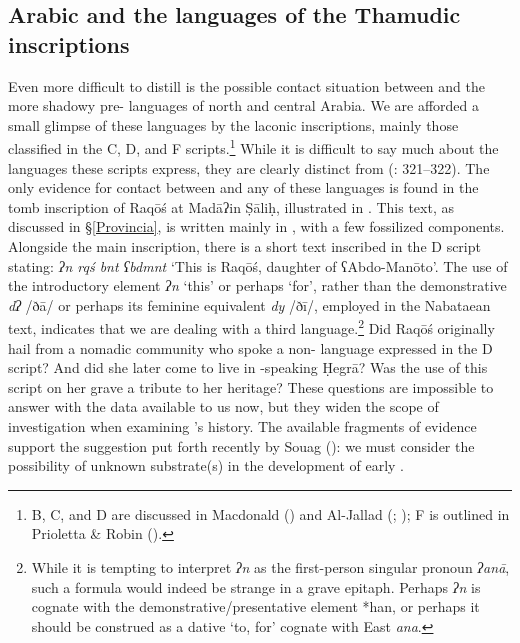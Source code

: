 \documentclass[output=paper]{langsci/langscibook}
\begin{document}
\subsection{Arabic and the languages of the Thamudic inscriptions}
Even more difficult to distill is the possible contact situation between  and the more shadowy pre-  languages of north and central Arabia. We are afforded a small glimpse of these languages by the laconic  inscriptions, mainly those classified in the C, D, and F scripts.\footnote{ B, C, and D are discussed in Macdonald (\citeyear{Macdonald2000}) and Al-Jallad (\citeyear{Al-Jallad2017early}; \citeyear{Al-Jallad2018ANA});  F is outlined in Prioletta \& Robin (\citeyear{PriolettaRobin2018}).}  While it is difficult to say much about the languages these scripts express, they are clearly distinct from  (\citealt{Al-Jallad2017early}: 321--322). The only evidence for contact between  and any of these languages is found in the tomb inscription of Raqōś at Madāʔin Ṣāliḥ, illustrated in . This text, as discussed in §\ref{Provincia}, is written mainly in , with a few fossilized  components. Alongside the main inscription, there is a short text inscribed in the  D script stating: \textit{ʔn rqś bnt ʕbdmnt} ‘This is Raqōś, daughter of ʕAbdo-Manōto’. The use of the introductory element \textit{ʔn} `this' or perhaps `for', rather than the  demonstrative \textit{dʔ} /ðā/ or perhaps its feminine equivalent \textit{dy} /ðī/, employed in the Nabataean text, indicates that we are dealing with a third language.\footnote{While it is tempting to interpret \textit{ʔn} as the first-person singular pronoun \textit{ʔanā}, such a formula would indeed be strange in a grave epitaph. Perhaps \textit{ʔn} is {cognate} with the demonstrative/presentative element *han, or perhaps it should be construed as a dative `to, for' {cognate} with East  \textit{ana}.} Did Raqōś originally hail from a nomadic community who spoke a non-  language expressed in the  D script? And did she later come to live in -speaking Ḥegrā? Was the use of this script on her grave a tribute to her heritage? These {questions} are impossible to answer with the data available to us now, but they widen the scope of investigation when examining ’s history. The available fragments of evidence support the suggestion put forth recently by Souag (\citeyear{Souag2018blog}): we must consider the possibility of unknown  {substrate}(s) in the development of early .
\end{document}
